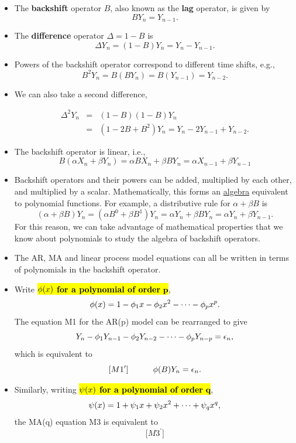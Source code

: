 \documentclass[]{article}
\begin{document}
\begin{itemize}
\item
  The \textbf{backshift} operator \(B\), also known as the \textbf{lag}
  operator, is given by \[ B Y_n = Y_{n-1}.\]
\item
  The \textbf{difference} operator \(\Delta=1-B\) is
  \[ \Delta Y_n = (1-B)Y_n = Y_n - Y_{n-1}.\]
\item
  Powers of the backshift operator correspond to different time shifts,
  e.g., \[ B^2 Y_n = B (BY_n) = B(Y_{n-1}) = Y_{n-2}.\]
\item
  We can also take a second difference,

  \begin{eqnarray}
  \Delta^2 Y_n &=& (1-B)(1-B) Y_n\\
  &=& (1-2B+B^2) Y_n = Y_n - 2Y_{n-1} + Y_{n-2}.
  \end{eqnarray}
\item
  The backshift operator is linear, i.e.,\\
  \[
  B(\alpha X_n + \beta Y_n) = \alpha BX_n +\beta BY_n = \alpha X_{n-1} +\beta Y_{n-1}
  \]
\item
  Backshift operators and their powers can be added, multiplied by each
  other, and multiplied by a scalar. Mathematically, this forms an
  \href{https://en.wikipedia.org/wiki/Algebra_over_a_field}{algebra}
  equivalent to polynomial functions. For example, a distributive rule
  for \(\alpha+\beta B\) is \[
  (\alpha +\beta B)Y_n = (\alpha B^0 +\beta B^1)Y_n = \alpha Y_n + \beta BY_n = \alpha Y_n + \beta Y_{n-1}.
  \] For this reason, we can take advantage of mathematical properties
  that we know about polynomials to study the algebra of backshift
  operators.
\item
  The AR, MA and linear process model equations can all be written in
  terms of polynomials in the backshift operator.
\item
  Write \hl{$\phi(x)$ \textbf{for a polynomial of order} $\bm p$},
  \[\phi(x) = 1-\phi_1 x -\phi_2 x^2 -\dots -\phi_p x^p.\] The equation M1
  for the AR(p) model can be rearranged to give \[
   Y_n - \phi_1 Y_{n-1}- \phi_2Y_{n-2}-\dots-\phi_pY_{n-p} = \epsilon_n,
  \] which is equivalent to $${[}M1^\prime{]}
  \quad\quad\quad \phi(B) Y_n = \epsilon_n. $$
\item
  Similarly, writing \hl{$\psi(x)$ \textbf{for a polynomial of order} $\bm q$},
  \[\psi(x) = 1+\psi_1 x +\psi_2 x^2 + \dots +\psi_q x^q,\] the MA(q)
  equation M3 is equivalent to $${[}M3^\prime{]}
$$
\end{itemize}
\end{document}
